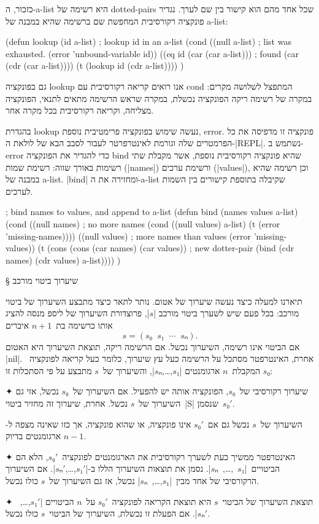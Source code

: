 \documentclass[a4paper,12pt,reqno]{article}
\begin{document}
כזכור, ה-a-list היא רשימה של dotted-pairs שכל אחד מהם הוא קישור בין שם לערך.
נגדיר פונקציה רקורסיבית המחפשת שם ברשימה שהיא במבנה של a-list:
\begin{LISP}
(defun lookup (id a-list) ; lookup id in an a-list
  (cond
    ((null a-list) ; list was exhausted.
      (error 'unbound-variable id))
    ((eq id (car (car a-list))) ; found
      (car (cdr (car a-list))))
    (t (lookup id (cdr a-list))))
)
\end{LISP}
גם בפונקציה lookup אנו רואים קריאה רקורסיבית עם cond המתפצל לשלושה מקרים: במקרה
של רשימה ריקה הפונקציה נכשלת, במקרה שראש הרשימה מתאים לתנאי, הפונקציה מצליחה,
וקריאה רקורסיבית בכל מקרה אחר.

בהגדרת lookup נעשה שימוש בפונקציה פרימטיבית נוספת, error. פונקציה זו מדפיסה את
כל הפרמטרים שלה וגורמת לאינטרפרטר לעבור לסבב הבא של לולאת ה-\E|REPL|.
נשתמש ב-error כדי להגדיר את הפונקציה bind שהיא פונקציה רקורסיבית נוספת,
אשר מקבלת שתי רשימות באורך שווה: רשימת שמות (\E|names|) ורשימת ערכים
(\E|values|), וכן רשימה שהיא במבנה של a-list.  \E|bind| ומחזירה את ה-a-list
שקיבלה בתוספת קישורים בין השמות לערכים.
\begin{LISP}
; bind names to values, and append to a-list
(defun bind (names values a-list)
  (cond
    ((null names) ; no more names
      (cond
        ((null values) a-list)
        (t (error 'missing-names))))
    ((null values) ; more names than values
      (error 'missing-values))
    (t
      (cons
        (cons (car names) (car values)) ; new dotter-pair
        (bind (cdr names) (cdr values) a-list))))
)
\end{LISP}

§ שיערוך ביטוי מורכב

תיארנו למעלה כיצד נעשה שיערוך של אטום. נותר לתאר כיצד מתבצע השיערוך של ביטוי
מורכב: בכל פעם שיש לשערך ביטוי מורכב \E|$s$|, פרוצדורת השיערוך של ליספ מנסה
להציג אותו כרשימה בת~$n+1$ איברים \[
  s=(s₀\;\;s₁\;\;⋯\;\;sₙ).
\] אם הביטוי אינו רשימה, השיערוך נכשל. אם הרשימה ריקה, תוצאת השיערוך היא האטום
\T|nil|. אחרת, האינטרפטר מסתכל על הרשימה כעל עץ שיערוך, כלומר כעל קריאה
לפונקציה~$s₀$ המקבלת~$n$ ארגומנטים \E|$s₁$,…,$sₙ$|, והשיערוך
של~$s$ מתבצע על פי הסתכלות זו:
\begin{enumerate}
  ✦ שיערוך רקורסיבי של~$s₀$, הפונקציה אותה יש להפעיל. אם השיערוך של~$s₀$ נכשל,
  אזי גם השיערוך של~$s$ נכשל. אחרת, שיערוך זה מחזיר ביטוי~\E|S| שנסמן~$s₀'$.

  השיערוך של~$s$ נכשל גם אם~$s₀'$ אינו פונקציה, או שהוא פונקציה, אך כזו שאינה
  מצפה ל-$n-1$ ארגומנטים בדיוק.

  ✦ האינטרפטר ממשיך כעת לשערך רקורסיבית את הארגומנטים לפונקציה~$s₀'$, הלא הם
  הביטויים~\E|$s₁$~,…,~$sₙ$|. נסמן את תוצאות השיערוך הללו ב-\E|$s₁'$,…,$sₙ'$|.
  אם השיערוך הרקורסיבי של אחד מבין~\E|$s₁$,…,~$sₙ$| נכשל, אז גם השיערוך של~$s$
  כולו נכשל.

  ✦ תוצאת השיערוך של הביטוי~$s$ היא תוצאת הקריאה לפונקציה~$s₀'$ על~$n$ הביטויים
  \E|$s₁'$,…,~$sₙ'$|. אם הפעלת זו נכשלת, השיערוך של הביטוי~$s$ כולו נכשל.
\end{enumerate}
\end{document}
